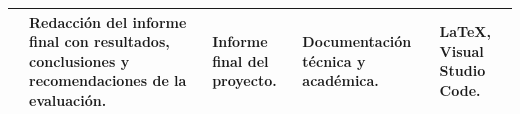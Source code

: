\begin{landscape}
\begin{table}[h]
\begin{tabular}{|c|p{5.5cm}|p{3.8cm}|p{4cm}|p{4cm}|}
& Redacción del informe final con resultados, conclusiones y recomendaciones de la evaluación.
& Informe final del proyecto.
& Documentación técnica y académica.
& \LaTeX, Visual Studio Code. \\ \hline

\end{tabular}
\end{table}
\end{landscape}

\clearpage
